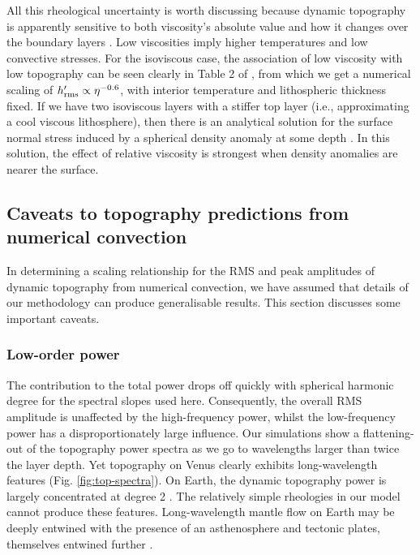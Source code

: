 All this rheological uncertainty is worth discussing because dynamic topography is apparently sensitive to both viscosity's absolute value and how it changes over the boundary layers \citep{hager_longwavelength_1989}. Low viscosities imply higher temperatures and low convective stresses. For the isoviscous case, the association of low viscosity with low topography can be seen clearly in Table 2 of \citet{lees_gravity_2020}, from which we get a numerical scaling of $h_{\rm rms}^\prime \propto \eta^{-0.6}$, with interior temperature and lithospheric thickness fixed. If we have two isoviscous layers with a stiffer top layer (i.e., approximating a cool viscous lithosphere), then there is an analytical solution for the surface normal stress induced by a spherical density anomaly at some depth \citep[equation (34) in][]{morgan_gravity_1965}. In this solution, the effect of relative viscosity is strongest when density anomalies are nearer the surface.






\subsection{Caveats to topography predictions from numerical convection}  \label{sec:discussion-modelling}

In determining a scaling relationship for the RMS and peak amplitudes of dynamic topography from numerical convection, we have assumed that details of our methodology can produce generalisable results. This section discusses some important caveats.

\subsubsection{Low-order power} 
\label{sec:discussion-loworder}
The contribution to the total power drops off quickly with spherical harmonic degree for the spectral slopes used here. Consequently, the overall RMS amplitude is unaffected by the high-frequency power, whilst the low-frequency power has a disproportionately large influence. Our simulations show a flattening-out of the topography power spectra as we go to wavelengths larger than twice the layer depth. Yet topography on Venus clearly exhibits long-wavelength features (Fig. \ref{fig:top-spectra}). On Earth, the dynamic topography power is largely concentrated at degree 2 \citep{hoggard_global_2016, 2021GeoJI.225.1637Y}. The relatively simple rheologies in our model cannot produce these features. Long-wavelength mantle flow on Earth may be deeply entwined with the presence of an asthenosphere and tectonic plates, themselves entwined further \citep{lenardic_boot_2019}.

